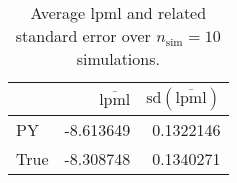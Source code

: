 \begin{table}[H]

\caption{Average lpml and related standard error over $n_{\text{sim}} = 10$ simulations.}
\centering
\begin{tabular}[t]{lrr}
\toprule
  & $\overbar{\text{lpml}}$ & $\text{sd}(\overbar{\text{lpml}})$\\
\midrule
PY & -8.613649 & 0.1322146\\
True & -8.308748 & 0.1340271\\
\bottomrule
\end{tabular}
\end{table}